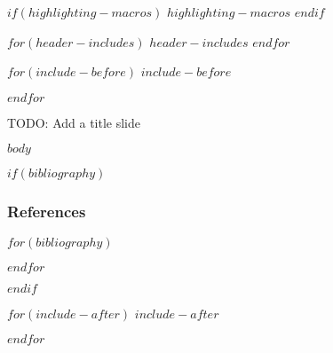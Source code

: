 \usepackage{amssymb}          %
\usepackage{amsmath}          %
\usepackage{hyperref}         %
\usepackage{fancyvrb}         %
\usepackage{fontspec}         %
\usepackage[skins]{tcolorbox} %

\providecommand{\tightlist}{\setlength{\itemsep}{0pt}\setlength{\parskip}{0pt}}

\setmainfont{Roboto Slab}
\setsansfont{Roboto Slab}
\setmonofont{JetBrains Mono}


$if(highlighting-macros)$
$highlighting-macros$
$endif$



$for(header-includes)$
$header-includes$
$endfor$



    $for(include-before)$
    $include-before$

    $endfor$

    \begin{frame}
        TODO: Add a title slide
    \end{frame}

    $body$

    $if(bibliography)$
    \begin{frame}[allowframebreaks]
        \frametitle{References}
        
        $for(bibliography)$
        
        $endfor$
    \end{frame}
    $endif$

    $for(include-after)$
    $include-after$

    $endfor$


